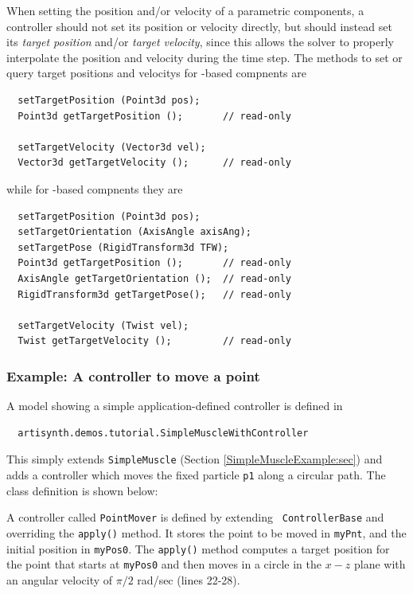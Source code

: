 When setting the position and/or velocity of a parametric components,
a controller should not set its position or velocity directly, but
should instead set its {\it target position} and/or {\it target
velocity}, since this allows the solver to properly interpolate the
position and velocity during the time step. The methods to set or
query target positions and velocitys for
-based compnents are
%
\begin{lstlisting}
  setTargetPosition (Point3d pos);
  Point3d getTargetPosition ();       // read-only

  setTargetVelocity (Vector3d vel);
  Vector3d getTargetVelocity ();      // read-only
\end{lstlisting}
%
while for
-based compnents they are
%
\begin{lstlisting}
  setTargetPosition (Point3d pos);
  setTargetOrientation (AxisAngle axisAng);
  setTargetPose (RigidTransform3d TFW);
  Point3d getTargetPosition ();       // read-only
  AxisAngle getTargetOrientation ();  // read-only
  RigidTransform3d getTargetPose();   // read-only

  setTargetVelocity (Twist vel);
  Twist getTargetVelocity ();         // read-only
\end{lstlisting}
%

\subsubsection{Example: A controller to move a point}

A model showing a simple application-defined controller is defined in
%
\begin{verbatim}
  artisynth.demos.tutorial.SimpleMuscleWithController
\end{verbatim}
%
This simply extends {\tt SimpleMuscle} (Section
\ref{SimpleMuscleExample:sec}) and adds a controller which
moves the fixed particle {\tt p1} along a circular path.
The class definition is shown below:
%
\lstset{numbers=left}

\lstset{numbers=none}
%
A controller called {\tt PointMover} is defined by extending {\tt
ControllerBase} and overriding the {\tt apply()} method. It stores the
point to be moved in {\tt myPnt}, and the initial position in
{\tt myPos0}. The {\tt apply()} method computes a target position for
the point that starts at {\tt myPos0} and then moves in a circle in the
$x-z$ plane with an angular velocity of $\pi/2$ rad/sec (lines 22-28).

